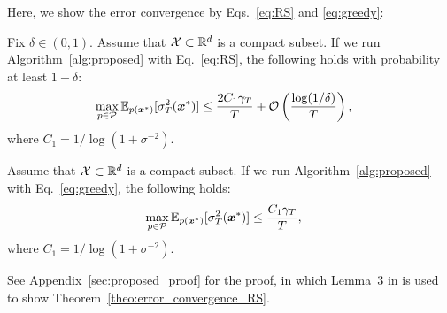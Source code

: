Here, we show the error convergence by Eqs.~\eqref{eq:RS} and \eqref{eq:greedy}:
\begin{theorem}
    Fix $\delta \in (0, 1)$.
    Assume that ${\cal X} \subset \mathbb{R}^d$ is a compact subset.
    If we run Algorithm~\ref{alg:proposed} with Eq.~\eqref{eq:RS}, the following holds with probability at least $1 - \delta$:
    \begin{align*}
        \max_{p \in {\cal P}} \mathbb{E}_{p(\boldsymbol{x}^{*})}[\sigma_{T}^2 (\boldsymbol{x}^{*})] 
        &\leq \frac{2 C_1 \gamma_T}{T} + {\cal O} \left( \frac{\log (1 / \delta)}{T} \right),
    \end{align*}
    where $C_1 = 1 / \log(1 + \sigma^{-2})$.
    \label{theo:error_convergence_RS}
\end{theorem}
%
\begin{theorem}
    Assume that ${\cal X} \subset \mathbb{R}^d$ is a compact subset.
    If we run Algorithm~\ref{alg:proposed} with Eq.~\eqref{eq:greedy}, the following holds:
    \begin{align*}
        \max_{p \in {\cal P}} \mathbb{E}_{p(\boldsymbol{x}^{*})}[\sigma_{T}^2 (\boldsymbol{x}^{*})] 
        &\leq \frac{C_1 \gamma_T}{T},
    \end{align*}
    where $C_1 = 1 / \log(1 + \sigma^{-2})$.
    \label{theo:error_convergence_greedy}
\end{theorem}
See Appendix~\ref{sec:proposed_proof} for the proof, in which Lemma~3 in \citet{kirschner2018-information} is used to show Theorem~\ref{theo:error_convergence_RS}.



